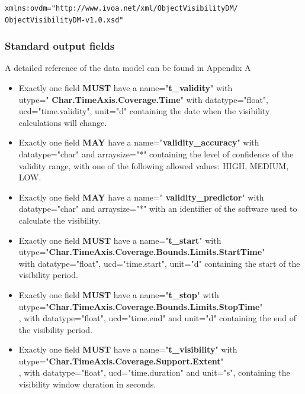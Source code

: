 \documentclass[11pt,a4paper]{ivoatex/ivoa}
\begin{document}
\begin{lstlisting}[language=XML]
xmlns:ovdm="http://www.ivoa.net/xml/ObjectVisibilityDM/
ObjectVisibilityDM-v1.0.xsd"
\end{lstlisting}

\subsubsection{Standard output fields}
A detailed reference of the data model can be found in Appendix A

\begin{itemize}
\item {Exactly one field \textbf{MUST} have a name="\textbf{t\_validity}"
with\\ utype=" \textbf{Char.TimeAxis.Coverage.Time}" with
datatype="float", ucd="time.validity", unit="d" containing the date when the visibility calculations will change.}

\item {Exactly one field \textbf{MAY} have a name="\textbf{validity\_accuracy}" 
with datatype="char" and arraysize="*" containing the level of
confidence of the validity range, with one of the following allowed
values: HIGH, MEDIUM, LOW.}

\item {Exactly one field \textbf{MAY} have a name="\textbf{
validity\_predictor}" with datatype="char" and arraysize="*" with an
identifier of the software used to calculate the visibility.}

\item {Exactly one field \textbf{MUST} have a name="\textbf{t\_start}" with\\
utype="\textbf{Char.TimeAxis.Coverage.Bounds.Limits.StartTime}"\\ with
datatype="float",  ucd="time.start", unit="d" containing the start of the visibility period.}

\item {Exactly one field \textbf{MUST} have a name="\textbf{t\_stop}" with\\
utype="\textbf{Char.TimeAxis.Coverage.Bounds.Limits.StopTime}"\\, with
datatype="float", ucd="time.end" and unit="d" containing the end of the visibility period.}

\item {Exactly one field \textbf{MUST} have a name="\textbf{t\_visibility}"
with\\ utype="\textbf{Char.TimeAxis.Coverage.Support.Extent}"\\, with
datatype="float", ucd="time.duration" and unit="s", containing the visibility window duration in seconds.}


\end{itemize}
\end{document}
